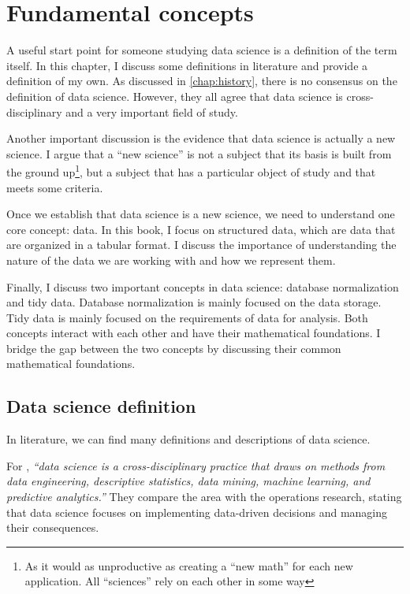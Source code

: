 \chapter{Fundamental concepts}
\label{chap:fundamental}

A useful start point for someone studying data science is a definition of the term itself.
In this chapter, I discuss some definitions in literature and provide a definition of my
own.  As discussed in \cref{chap:history}, there is no consensus on the definition of data
science.  However, they all agree that data science is cross-disciplinary and a very
important field of study.

Another important discussion is the evidence that data science is actually a new science.
I argue that a ``new science'' is not a subject that its basis is built from the ground
up\footnote{As it would as unproductive as creating a ``new math'' for each new
application.  All ``sciences'' rely on each other in some way}, but a subject that has a
particular object of study and that meets some criteria.

Once we establish that data science is a new science, we need to understand one core
concept: data.  In this book, I focus on structured data, which are data that are organized
in a tabular format.  I discuss the importance of understanding the nature of the data we
are working with and how we represent them.

Finally, I discuss two important concepts in data science: database normalization and tidy
data.  Database normalization is mainly focused on the data storage.  Tidy data is mainly
focused on the requirements of data for analysis.  Both concepts interact with each other
and have their mathematical foundations.  I bridge the gap between the two concepts by
discussing their common mathematical foundations.

\section{Data science definition}

In literature, we can find many definitions and descriptions of data science.

For \textcite{Zumel2019}, \emph{``data science is a cross-disciplinary practice that draws
on methods from data engineering, descriptive statistics, data mining, machine learning,
and predictive analytics.''}  They compare the area with the operations research, stating
that data science focuses on implementing data-driven decisions and managing their
consequences.

